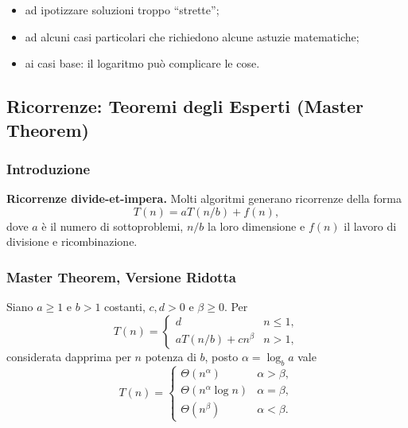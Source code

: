 \documentclass[12pt, a4paper]{article}
\begin{document}
\begin{tcolorbox}[colback=lightergray!5, colframe=tocsubsec, title=\textbf{Attenzione}]
\begin{itemize}
    \item ad ipotizzare soluzioni troppo ``strette'';
    \item ad alcuni casi particolari che richiedono alcune astuzie matematiche;
    \item ai casi base: il logaritmo può complicare le cose.
\end{itemize}
\end{tcolorbox}


\subsection{Ricorrenze: Teoremi degli Esperti (Master Theorem)}
\label{sec:master-theorem}

\subsubsection{Introduzione}

\textbf{Ricorrenze divide-et-impera.} Molti algoritmi generano ricorrenze della forma
$$T(n) = aT(n/b) + f(n),$$
dove $a$ è il numero di sottoproblemi, $n/b$ la loro dimensione e $f(n)$ il lavoro di divisione e ricombinazione.

\subsubsection{Master Theorem, Versione Ridotta}

\begin{tcolorbox}[colback=lightergray!10, colframe=tocsec, title=\textbf{Teorema (Master Theorem, Versione Ridotta)}]
\label{teo:master-ridotto}
Siano $a\ge 1$ e $b>1$ costanti, $c,d>0$ e $\beta\ge 0$. Per
$$T(n) = \begin{cases} d & n\le 1, \\ aT(n/b)+cn^\beta & n>1, \end{cases}$$
considerata dapprima per $n$ potenza di $b$, posto $\alpha=\log_b a$ vale
$$T(n) = \begin{cases} \Theta(n^\alpha) & \alpha>\beta, \\ \Theta(n^\alpha\log n) & \alpha=\beta, \\ \Theta(n^\beta) & \alpha<\beta. \end{cases}$$
\end{tcolorbox}
\end{document}
